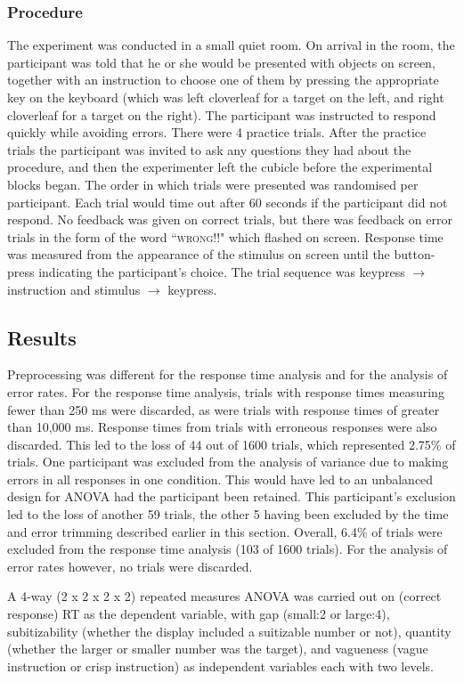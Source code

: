 \documentclass[doc,floatmark]{apa}
\begin{document}
\subsubsection{Procedure}
The experiment was conducted in a small quiet room. On arrival in the room, the participant was told that he or she would be presented with objects on screen, together with an instruction to choose one of them by pressing the appropriate key on the keyboard (which was left cloverleaf for a target on the left, and right cloverleaf for a target on the right). The participant was instructed to respond quickly while avoiding errors.
There were 4 practice trials. After the practice trials the participant was invited to ask any questions they had about the procedure, and then the experimenter left the cubicle before the experimental blocks began.
The order in which trials were presented was randomised per participant. Each trial would time out after 60 seconds if the participant did not respond. No feedback was given on correct trials, but there was feedback on error trials in the form of the word ``\textsc{wrong!!}" which flashed on screen. Response time was measured from the appearance of the stimulus on screen until the button-press indicating the participant's choice. The trial sequence was keypress $\rightarrow$ instruction and stimulus $\rightarrow$ keypress.

\subsection{Results}
Preprocessing was different for the response time analysis and for the analysis of error rates. For the response time analysis, trials with response times measuring fewer than 250 ms were discarded, as were trials with response times of greater than 10,000 ms. Response times from trials with erroneous responses were also discarded.  This led to the loss of 44 out of 1600 trials, which represented 2.75\% of trials. One participant was excluded from the analysis of variance due to making errors in all responses in one condition. This would have led to an unbalanced design for ANOVA had the participant been retained. This participant's exclusion led to the loss of another 59 trials, the other 5 having been excluded by the time and error trimming described earlier in this section. Overall, 6.4\% of trials were excluded from the response time analysis (103 of 1600 trials). For the analysis of error rates however, no trials were discarded.

A 4-way (2 x 2 x 2 x 2) repeated measures ANOVA was carried out on (correct response) RT as the dependent variable, with gap (small:2 or large:4), subitizability (whether the display included a suitizable number or not), quantity (whether the larger or smaller number was the target), and vagueness  (vague instruction or crisp instruction) as independent variables each with two levels. 
\end{document}
